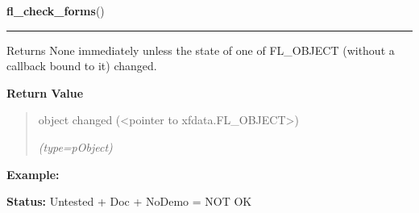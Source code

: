     \label{xformslib:library:fl_check_forms}

    \vspace{0.5ex}

\hspace{.8\funcindent}\begin{boxedminipage}{\funcwidth}

    \raggedright \textbf{fl\_check\_forms}()

    \vspace{-1.5ex}

    \rule{\textwidth}{0.5\fboxrule}
\setlength{\parskip}{2ex}
    Returns None immediately unless the state of one of FL\_OBJECT (without
    a callback bound to it) changed.

\setlength{\parskip}{1ex}
      \textbf{Return Value}
    \vspace{-1ex}

      \begin{quote}
      object changed ({\textless}pointer to 
      xfdata.FL\_OBJECT{\textgreater})

      {\it (type=pObject)}

      \end{quote}

\textbf{Example:} 

\textbf{Status:} Untested + Doc + NoDemo = NOT OK



    \end{boxedminipage}

    \label{xformslib:library:fl_do_only_forms}

    \vspace{0.5ex}

